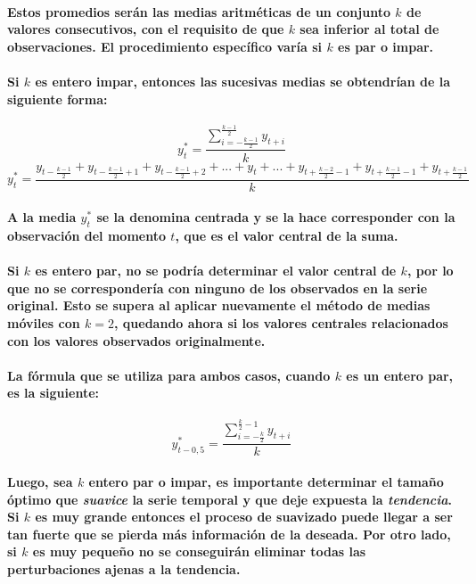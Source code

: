 \paragraph{
Estos promedios serán las medias aritméticas de un conjunto $k$ de valores consecutivos, con el requisito de que $k$ sea inferior al total de observaciones. El procedimiento específico varía si $k$ es par o impar.
}
\paragraph{
Si $k$ es entero impar, entonces las sucesivas medias se obtendrían de la siguiente forma:
}
\begin{equation}
y_t^* = \displaystyle\frac{\displaystyle\sum_{i=-\frac{k-1}{2}}^{\frac{k-1}{2}}y_{t+i}}{k}
\end{equation}
\begin{equation}
y_t^* = \frac{
y_{t-\frac{k-1}{2}}   +
y_{t-\frac{k-1}{2}+1} +
y_{t-\frac{k-1}{2}+2} +
... +
y_t  +
... +
y_{t+\frac{k-2}{2}-1} +
y_{t+\frac{k-1}{2}-1} +
y_{t+\frac{k-1}{2}}
}{k}
\end{equation}
\paragraph{
A la media $y_t^*$ se la denomina centrada y se la hace corresponder con la observación del momento $t$, que es el valor central de la suma.
}
\paragraph{
Si $k$ es entero par, no se podría determinar el valor central de $k$, por lo que no se correspondería con ninguno de los observados en la serie original. Esto se supera al aplicar nuevamente el método de medias móviles con $k=2$, quedando ahora si los valores centrales relacionados con los valores observados originalmente.
}
\paragraph{
La fórmula que se utiliza para ambos casos, cuando $k$ es un entero par, es la siguiente:
}
\begin{equation}
y_{t-0,5}^* = \displaystyle\frac{\displaystyle\sum_{i=-\frac{k}{2}}^{\frac{k}{2}-1} y_{t+i}}{k}
\end{equation}
\paragraph{
Luego, sea $k$ entero par o impar, es importante determinar el tamaño óptimo que \emph{suavice} la serie temporal y que deje expuesta la \emph{tendencia}. Si $k$ es muy grande entonces el proceso de suavizado puede llegar a ser tan fuerte que se pierda más información de la deseada. Por otro lado, si $k$ es muy pequeño no se conseguirán eliminar todas las perturbaciones ajenas a la tendencia.
}
